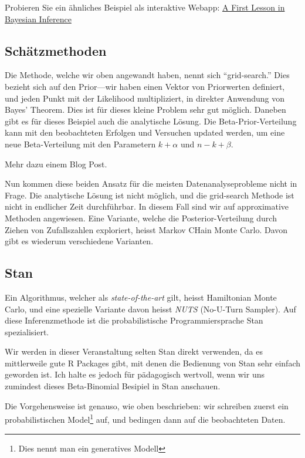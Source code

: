 \documentclass[]{tufte-handout}
\begin{document}
Probieren Sie ein ähnliches Beispiel als interaktive Webapp:
\href{https://tellmi.psy.lmu.de/felix/BayesLessons/BayesianLesson1.Rmd}{A
First Lesson in Bayesian Inference}

\hypertarget{schuxe4tzmethoden}{%
\subsection{Schätzmethoden}\label{schuxe4tzmethoden}}

Die Methode, welche wir oben angewandt haben, nennt sich
``grid-search.'' Dies bezieht sich auf den Prior---wir haben einen
Vektor von Priorwerten definiert, und jeden Punkt mit der Likelihood
multipliziert, in direkter Anwendung von Bayes' Theorem. Dies ist für
dieses kleine Problem sehr gut möglich. Daneben gibt es für dieses
Beispiel auch die analytische Lösung. Die Beta-Prior-Verteilung kann mit
den beobachteten Erfolgen und Versuchen updated werden, um eine neue
Beta-Verteilung mit den Parametern \(k + \alpha\) und \(n - k + \beta\).

Mehr dazu einem Blog Post.

Nun kommen diese beiden Ansatz für die meisten Datenanalyseprobleme
nicht in Frage. Die analytische Lösung ist nicht möglich, und die
grid-search Methode ist nicht in endlicher Zeit durchführbar. In diesem
Fall sind wir auf approximative Methoden angewiesen. Eine Variante,
welche die Posterior-Verteilung durch Ziehen von Zufallszahlen
exploriert, heisst Markov CHain Monte Carlo. Davon gibt es wiederum
verschiedene Varianten.

\hypertarget{stan}{%
\subsection{Stan}\label{stan}}

Ein Algorithmus, welcher als \emph{state-of-the-art} gilt, heisst
Hamiltonian Monte Carlo, und eine spezielle Variante davon heisst
\emph{NUTS} (No-U-Turn Sampler). Auf diese Inferenzmethode ist die
probabilistische Programmiersprache Stan spezialisiert.

Wir werden in dieser Veranstaltung selten Stan direkt verwenden, da es
mittlerweile gute R Packages gibt, mit denen die Bedienung von Stan sehr
einfach geworden ist. Ich halte es jedoch für pädagogisch wertvoll, wenn
wir uns zumindest dieses Beta-Binomial Besipiel in Stan anschauen.

Die Vorgehensweise ist genauso, wie oben beschrieben: wir schreiben
zuerst ein probabilistischen Model\footnote{Dies nennt man ein
  generatives Modell} auf, und bedingen dann auf die beobachteten Daten.
\end{document}
